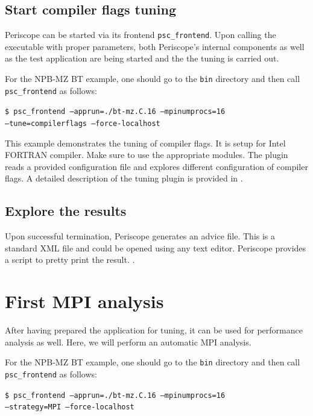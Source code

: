 \documentclass[11pt,oneside,a4paper]{book}
\newcommand{\comment}[1]{\marginpar{\scriptsize{\textcolor{red}{#1}}}}
\newenvironment{code}%
{
\addtolength{\leftskip}{0.5cm}}%
{

}
\begin{document}
\subsection{Start compiler flags tuning}

Periscope can be started via its frontend \texttt{psc\_frontend}. Upon calling the executable with proper parameters, both Periscope's internal components as well as the test application are being started and the the tuning is carried out.

For the NPB-MZ BT example, one should go to the \texttt{bin} directory and then call \texttt{psc\_frontend} as follows:

\begin{code}
\texttt{\$ psc\_frontend --apprun=./bt-mz.C.16 --mpinumprocs=16 \\--tune=compilerflags --force-localhost}
\end{code}

This example demonstrates the tuning of compiler flags. It is setup for Intel FORTRAN compiler. Make sure to use the appropriate modules. The plugin reads a provided configuration file and explores different configuration of compiler flags. A detailed description of the tuning plugin is provided in \comment{Compiler flags plugin users guide.}.

\subsection{Explore the results}

Upon successful termination, Periscope generates an advice file. This is a standard XML file and could be opened using any text editor. Periscope provides a script to pretty print the result. \comment{Explain usage of python script}.

\section{First MPI analysis}

After having prepared the application for tuning, it can be used for performance analysis as well. Here, we will perform an automatic MPI analysis. 

For the NPB-MZ BT example, one should go to the \texttt{bin} directory and then call \texttt{psc\_frontend} as follows:

\begin{code}
\texttt{\$ psc\_frontend --apprun=./bt-mz.C.16 --mpinumprocs=16 \\--strategy=MPI --force-localhost}
\end{code}
\end{document}
